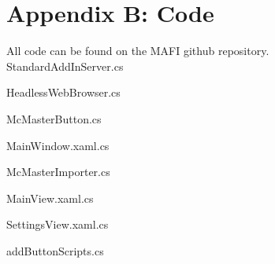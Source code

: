 \documentclass[12pt, letterpaper]{article}
\begin{document}
\newpage
\section{Appendix B: Code}
All code can be found on the MAFI github repository\cite{MAFI}.\\
StandardAddInServer.cs

\newpage
HeadlessWebBrowser.cs

\newpage
McMasterButton.cs

\newpage
MainWindow.xaml.cs

\newpage
McMasterImporter.cs

\newpage
MainView.xaml.cs

\newpage
SettingsView.xaml.cs

\newpage
addButtonScripts.cs

\end{document}
